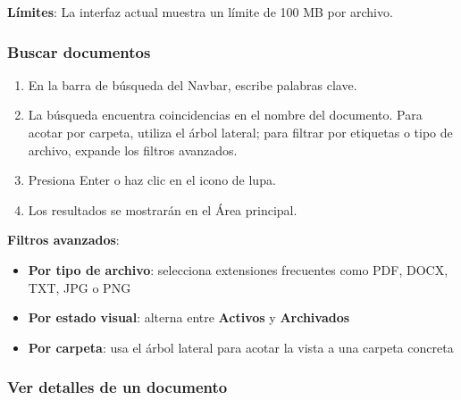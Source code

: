\documentclass[11pt, a4paper]{article}
\begin{document}
\textbf{Límites}: La interfaz actual muestra un límite de 100 MB por archivo.

\subsubsection{Buscar documentos}

\begin{enumerate}
    \item En la barra de búsqueda del Navbar, escribe palabras clave.
    \item La búsqueda encuentra coincidencias en el nombre del documento. Para acotar por carpeta, utiliza el árbol lateral; para filtrar por etiquetas o tipo de archivo, expande los filtros avanzados.
    \item Presiona Enter o haz clic en el icono de lupa.
    \item Los resultados se mostrarán en el Área principal.
\end{enumerate}

\textbf{Filtros avanzados}:

\begin{itemize}
    \item \textbf{Por tipo de archivo}: selecciona extensiones frecuentes como PDF, DOCX, TXT, JPG o PNG
    \item \textbf{Por estado visual}: alterna entre \textbf{Activos} y \textbf{Archivados}
    \item \textbf{Por carpeta}: usa el árbol lateral para acotar la vista a una carpeta concreta
\end{itemize}

\subsubsection{Ver detalles de un documento}
\end{document}
